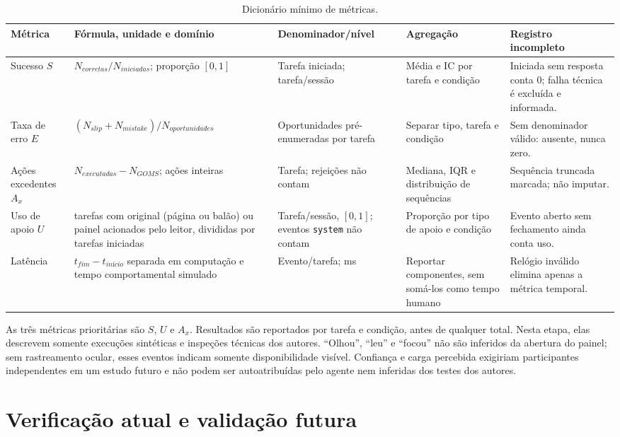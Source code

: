 \documentclass[conference]{IEEEtran}
\newcommand{\code}[1]{\texttt{#1}}
\begin{document}
\begin{table}[t]
\caption{Dicionário mínimo de métricas.}
\label{tab:metrics}
\centering\scriptsize
\begin{tabularx}{\textwidth}{p{2cm}Y Y Y Y}
\toprule
Métrica & Fórmula, unidade e domínio & Denominador/nível & Agregação & Registro incompleto \\
\midrule
Sucesso $S$ & $N_{corretas}/N_{iniciadas}$; proporção $[0,1]$ & Tarefa iniciada; tarefa/sessão & Média e IC por tarefa e condição & Iniciada sem resposta conta 0; falha técnica é excluída e informada. \\
Taxa de erro $E$ & $(N_{slip}+N_{mistake})/N_{oportunidades}$ & Oportunidades pré-enumeradas por tarefa & Separar tipo, tarefa e condição & Sem denominador válido: ausente, nunca zero. \\
Ações excedentes $A_x$ & $N_{executadas}-N_{GOMS}$; ações inteiras & Tarefa; rejeições não contam & Mediana, IQR e distribuição de sequências & Sequência truncada marcada; não imputar. \\
Uso de apoio $U$ & tarefas com original (página ou balão) ou painel acionados pelo leitor, divididas por tarefas iniciadas & Tarefa/sessão, $[0,1]$; eventos \code{system} não contam & Proporção por tipo de apoio e condição & Evento aberto sem fechamento ainda conta uso. \\
Latência & $t_{fim}-t_{início}$ separada em computação e tempo comportamental simulado & Evento/tarefa; ms & Reportar componentes, sem somá-los como tempo humano & Relógio inválido elimina apenas a métrica temporal. \\
\bottomrule
\end{tabularx}
\end{table}

As três métricas prioritárias são $S$, $U$ e $A_x$. Resultados são reportados por tarefa e condição, antes de qualquer total. Nesta etapa, elas descrevem somente execuções sintéticas e inspeções técnicas dos autores. ``Olhou'', ``leu'' e ``focou'' não são inferidos da abertura do painel; sem rastreamento ocular, esses eventos indicam somente disponibilidade visível. Confiança e carga percebida exigiriam participantes independentes em um estudo futuro e não podem ser autoatribuídas pelo agente nem inferidas dos testes dos autores.

\section{Verificação atual e validação futura}
\end{document}

